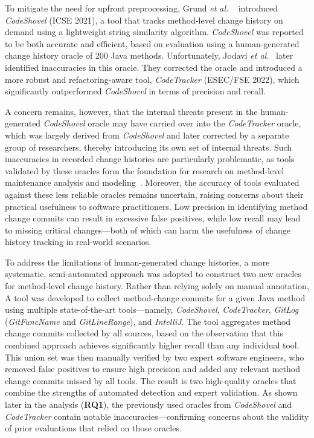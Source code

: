 To mitigate the need for upfront preprocessing, Grund \textit{et al.} ~\cite{grund_codeshovel_2021} introduced \textit{CodeShovel} (ICSE 2021), a tool that tracks method-level change history on demand using a lightweight string similarity algorithm. \textit{CodeShovel} was reported to be both accurate and efficient, based on evaluation using a human-generated change history oracle of 200 Java methods. Unfortunately, Jodavi \textit{et al.}~\cite{jodavi_accurate_2022} later identified inaccuracies in this oracle. They corrected the oracle and introduced a more robust and refactoring-aware tool,  \textit{CodeTracker} (ESEC/FSE 2022), which significantly outperformed \textit{CodeShovel} in terms of precision and recall.

A concern remains, however, that the internal threats present in the human-generated \textit{CodeShovel} oracle may have carried over into the \textit{CodeTracker} oracle, which was largely derived from \textit{CodeShovel} and later corrected by a separate group of researchers, thereby introducing its own set of internal threats. Such inaccuracies in recorded change histories are particularly problematic, as tools validated by these oracles form the foundation for research on method-level maintenance analysis and modeling~\cite{ahmad_impact_2025, chowdhury_evidence_2025, chowdhury_good_2025, chowdhury_method-level_2024, chowdhury_revisiting_2022}. Moreover, the accuracy of tools evaluated against these less reliable oracles remains uncertain, raising concerns about their practical usefulness to software practitioners. Low precision in identifying method change commits can result in excessive false positives, while low recall may lead to missing critical changes—both of which can harm the usefulness of change history tracking in real-world scenarios.

To address the limitations of human-generated change histories, a more systematic, semi-automated approach was adopted to construct two new oracles for method-level change history. Rather than relying solely on manual annotation, A tool was developed to collect method-change commits for a given Java method using multiple state-of-the-art tools—namely, \textit{CodeShovel}, \textit{CodeTracker}, \textit{GitLog} (\textit{GitFuncName} and \textit{GitLineRange}), and \textit{IntelliJ}. The tool aggregates method change commits collected by all sources, based on the observation that this combined approach achieves significantly higher recall than any individual tool. This union set was then manually verified by two expert software engineers, who removed false positives to ensure high precision and added any relevant method change commits missed by all tools. The result is two high-quality oracles that combine the strengths of automated detection and expert validation. As shown later in the analysis (\textbf{RQ1}), the previously used oracles from \textit{CodeShovel} and \textit{CodeTracker} contain notable inaccuracies—confirming concerns about the validity of prior evaluations that relied on those oracles.

